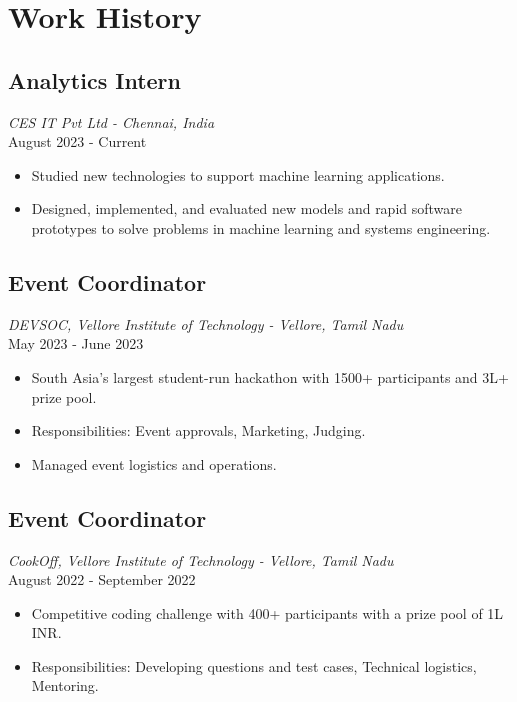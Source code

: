 \documentclass[a4paper,10pt]{article}
\begin{document}
\vspace{10pt}

\section*{Work History}
\subsection*{\large\textbf{Analytics Intern}}
\textit{CES IT Pvt Ltd - Chennai, India} \\
August 2023 - Current
\begin{itemize}
    \item Studied new technologies to support machine learning applications.
    \item Designed, implemented, and evaluated new models and rapid software prototypes to solve problems in machine learning and systems engineering.
\end{itemize}

\subsection*{\large\textbf{Event Coordinator}}
\textit{DEVSOC, Vellore Institute of Technology - Vellore, Tamil Nadu} \\
May 2023 - June 2023
\begin{itemize}
    \item South Asia's largest student-run hackathon with 1500+ participants and 3L+ prize pool.
    \item Responsibilities: Event approvals, Marketing, Judging.
    \item Managed event logistics and operations.
\end{itemize}

\subsection*{\large\textbf{Event Coordinator}}
\textit{CookOff, Vellore Institute of Technology - Vellore, Tamil Nadu} \\
August 2022 - September 2022
\begin{itemize}
    \item Competitive coding challenge with 400+ participants with a prize pool of 1L INR.
    \item Responsibilities: Developing questions and test cases, Technical logistics, Mentoring.
\end{itemize}
\end{document}
